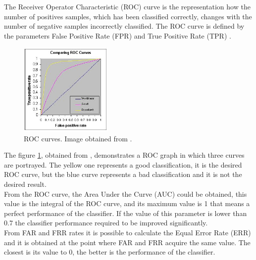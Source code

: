 The Receiver Operator Characteristic (ROC) curve is the representation how the number of positives samples, which has been classified correctly, changes with the number of negative samples incorrectly classified. The ROC curve is defined by the parameters False Positive Rate (FPR) and True Positive Rate (TPR) \cite{ROC}.\\

\begin{figure}[htb]
  \centering
  \includegraphics[width=0.4\textwidth]{images_miscelaneus/roccomp.jpg}
  \caption{ROC curves. Image obtained from \cite{RocImage}.}
  \label{RocImage}
\end{figure}

The figure \ref{RocImage}, obtained from \cite{RocImage}, demonstrates a ROC graph in which three curves are portrayed.  The yellow one represents a good classification, it is the desired ROC curve, but the blue curve represents a bad classification and it is not the desired result.\\

From the ROC curve, the Area Under the Curve (AUC) could be obtained, this value is the integral of the ROC curve, and its maximum value is 1 that means a perfect performance of the classifier. If the value of this parameter is lower than 0.7 the classifier performance required to be improved significantly.\\

From FAR and FRR rates it is possible to calculate the Equal Error Rate (ERR) and it is obtained at the point where FAR and FRR acquire the same value. The closest is its value to 0, the better is the performance of the classifier.


